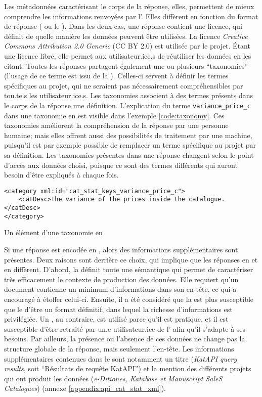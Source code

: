 Les métadonnées caractérisant le corps de la réponse, elles, permettent de mieux comprendre les informations renvoyées par l'\api{}. Elles diffèrent en fonction du format de réponse (\json{} ou le \tei{}). Dans les deux cas, une réponse contient une licence, qui définit de quelle manière les données peuvent être utilisées. La licence \textit{Creative Commons Attribution 2.0 Generic} (CC BY 2.0) est utilisée par le projet. Étant une licence libre, elle permet aux utilisateur.ice.s de réutiliser les données en les citant. Toutes les réponses partagent également une ou plusieurs \enquote{taxonomies} (l'usage de ce terme est issu de la \tei{}). Celles-ci servent à définir les termes spécifiques au projet, qui ne seraient pas nécessairement compréhensibles par tou.te.s les utilisateur.ice.s. Les taxonomies associent à des termes présents dans le corps de la réponse une définition. L'explication du terme \texttt{variance\_price\_c} dans une taxonomie en \tei{} est visible dans l'exemple \ref{code:taxonomy}. Ces taxonomies améliorent la compréhension de la réponse par une personne humaine; mais elles offrent aussi des possibilités de traitement par une machine, puisqu'il est par exemple possible de remplacer un terme spécifique au projet par sa définition. Les taxonomies présentes dans une réponse changent selon le point d'accès aux données choisi, puisque ce sont des termes différents qui auront besoin d'être expliqués à chaque fois.

\begin{listing}[h]
	\begin{verbatim}
<category xml:id="cat_stat_keys_variance_price_c">
	<catDesc>The variance of the prices inside the catalogue.</catDesc>
</category>
	\end{verbatim}
	\caption{Un élément d'une taxonomie en \tei{}}
	\label{code:taxonomy}
\end{listing}

Si une réponse est encodée en \tei{}, alors des informations supplémentaires sont présentes. Deux raisons sont derrière ce choix, qui implique que les réponses en \json{} et en \tei{} diffèrent. D'abord, la \tei{} définit toute une sémantique qui permet de caractériser très efficacement le contexte de production des données. Elle requiert qu'un document contienne un minimum d'informations dans son en-tête, ce qui a encouragé à étoffer celui-ci. Ensuite, il a été considéré que la \tei{} est plus susceptible que le \json{} d'être un format définitif, dans lequel la richesse d'informations est privilégiée. Un \json{}, au contraire, est utilisé parce qu'il est pratique, et il est susceptible d'être retraité par un.e utilisateur.ice de l'\api{} afin qu'il s'adapte à ses besoins. Par ailleurs, la présence ou l'absence de ces données ne change pas la structure globale de la réponse, mais seulement l'en-tête. Les informations supplémentaires contenues dans le \tei{} sont notamment un titre (\textit{KatAPI query results}, soit \enquote{Résultats de requête KatAPI}) et la mention des différents projets qui ont produit les données (\textit{e-Ditiones, Katabase et Manuscript SaleS Catalogues}) (annexe \ref{appendix:api_cat_stat_xml}).


